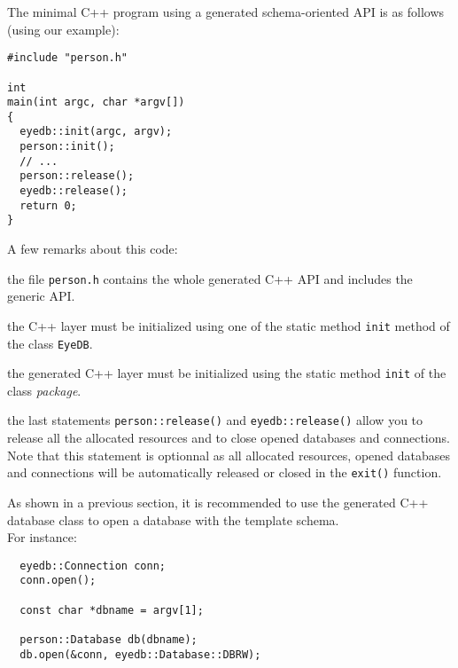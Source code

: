 The minimal \eyedb C++ program using a generated schema-oriented API
is as follows (using our example):
\verbsize
\begin{verbatim}
#include "person.h"

int
main(int argc, char *argv[])
{
  eyedb::init(argc, argv);
  person::init();
  // ...
  person::release();
  eyedb::release();
  return 0;
}
\end{verbatim}
\normalsize
A few remarks about this code:
\be
\item the file \texttt{person.h} contains the whole generated C++ API and
includes the generic \eyedb API.
\item the \eyedb C++ layer must be initialized using one of the static method
\texttt{init} method of the class \texttt{EyeDB}.
\item the generated C++ layer must be initialized using the static method
\texttt{init} of the class \emph{package}.
\item the last statements \texttt{person::release()} and \texttt{eyedb::release()}
allow you to release all the allocated resources and to close opened databases
and connections.
\\
Note that this statement is optionnal as all allocated resources,
opened databases and connections will be automatically released or closed
in the \texttt{exit()} function.
\ee

As shown in a previous section, it is recommended to use the generated
C++ database class to open a database with the template schema.
\\
For instance:
\verbsize
\begin{verbatim}
  eyedb::Connection conn;
  conn.open();

  const char *dbname = argv[1];

  person::Database db(dbname);
  db.open(&conn, eyedb::Database::DBRW);
\end{verbatim}
\normalsize

